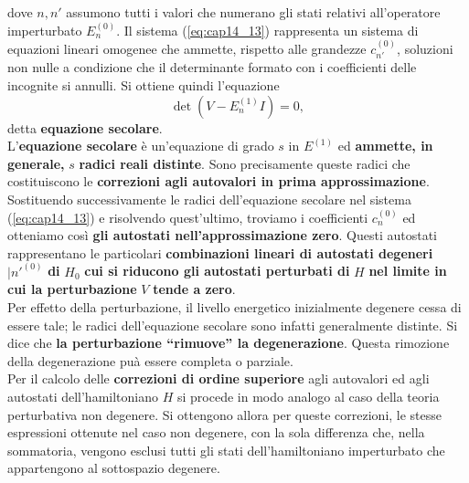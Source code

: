 \documentclass[a4paper,12pt,oneside]{book}
\begin{document}
dove $n, n'$ assumono tutti i valori che numerano gli stati relativi all'operatore imperturbato $E_n ^{(0)}$. Il sistema (\ref{eq:cap14_13}) rappresenta un sistema di equazioni lineari omogenee che ammette, rispetto alle grandezze $c_{n'} ^{(0)}$, soluzioni non nulle a condizione che il determinante formato con i coefficienti delle incognite si annulli. Si ottiene quindi l'equazione
\begin{equation}
\det \left( V - E_n ^{(1)} I \right) =0,
\end{equation}
detta \textbf{equazione secolare}.\\
L'\textbf{equazione secolare} è un'equazione di grado $s$ in $E^{(1)}$ ed \textbf{ammette, in generale,} $s$ \textbf{radici reali distinte}. Sono precisamente queste radici che costituiscono le \textbf{correzioni agli autovalori in prima approssimazione}.\\
Sostituendo successivamente le radici dell'equazione secolare nel sistema (\ref{eq:cap14_13}) e risolvendo quest'ultimo, troviamo i coefficienti $c_n ^{(0)}$ ed otteniamo così \textbf{gli autostati nell'approssimazione zero}. Questi autostati rappresentano le particolari \textbf{combinazioni lineari di autostati degeneri} $\vert n'^{(0)}$ \textbf{di} $H_0$ \textbf{cui si riducono gli autostati perturbati di} $H$ \textbf{ nel limite in cui la perturbazione} $V$ \textbf{tende a zero}.\\
Per effetto della perturbazione, il livello energetico inizialmente degenere cessa di essere tale; le radici dell'equazione secolare sono infatti generalmente distinte. Si dice che \textbf{la perturbazione ``rimuove'' la degenerazione}. Questa rimozione della degenerazione puà essere completa o parziale.\\
Per il calcolo delle \textbf{correzioni di ordine superiore} agli autovalori ed agli autostati dell'hamiltoniano $H$ si procede in modo analogo al caso della teoria perturbativa non degenere. Si ottengono allora per queste correzioni, le stesse espressioni ottenute nel caso non degenere, con la sola differenza che, nella sommatoria, vengono esclusi tutti gli stati dell'hamiltoniano imperturbato che appartengono al sottospazio degenere.
\end{document}
